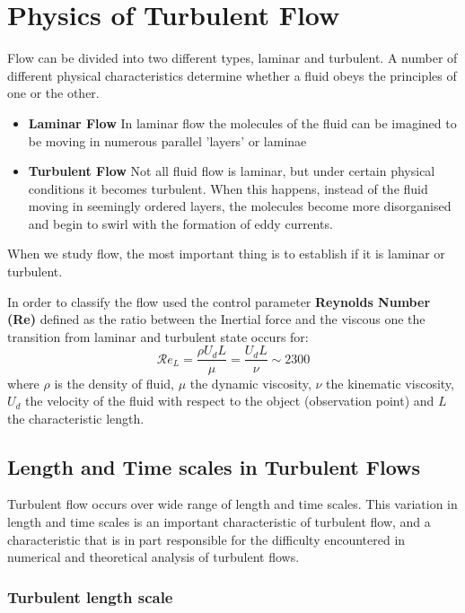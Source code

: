 \section{Physics of Turbulent Flow}

Flow can be divided into two different types, laminar and turbulent.
A number of different physical characteristics determine whether a fluid obeys the principles of one or the other.

\begin{itemize}

\item \textbf{Laminar Flow} In laminar flow the molecules of the fluid can be imagined to be moving in numerous parallel 'layers' or laminae %
\item \textbf{Turbulent Flow} Not all fluid flow is laminar, but under certain physical conditions it becomes turbulent.
When this happens, instead of the fluid moving in seemingly ordered 
layers, the molecules become more disorganised and begin to swirl with the formation of eddy currents.
\end{itemize}

When we study flow, the most important thing is to establish if it is laminar or turbulent.

In order to classify the flow used the control parameter \textbf{Reynolds Number (Re)} defined as the ratio between the Inertial force and the viscous one the transition from laminar and turbulent state occurs for:
\begin{equation}
\mathcal{R}e_L = \frac{\rho U_d L}{\mu} = \frac{U_d L}{\nu} \sim 2300
\label{eq:re}
\end{equation}
where $\rho$ is the density of fluid, $\mu$ the dynamic viscosity, 
$\nu$ the kinematic viscosity, $U_d$ the velocity of the fluid with respect to the object (observation point) and $L$ the characteristic length.  


\subsection{Length and Time scales in Turbulent Flows}

Turbulent flow occurs over wide range of length and time scales. 
This variation in length and time scales is an important characteristic of turbulent flow, and a characteristic that is in part responsible for the difficulty encountered in numerical and theoretical analysis of turbulent flows. 


\subsubsection{Turbulent length scale}

